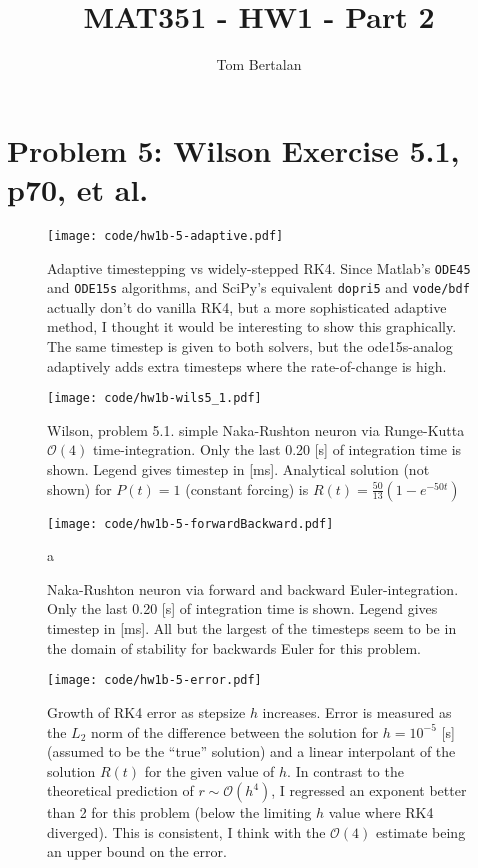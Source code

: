 \documentclass{tufte-handout}
\title{MAT351 - HW1 - Part 2}
\author{Tom Bertalan}
\begin{document}
\maketitle
\tableofcontents

\newpage
\section{Problem 5: Wilson Exercise 5.1, p70, et al.}
\begin{figure}[ht]
 \texttt{[image: code/hw1b-5-adaptive.pdf]}
 \caption{Adaptive timestepping vs widely-stepped RK4. Since Matlab's 
\texttt{ODE45} and \texttt{ODE15s} algorithms, and SciPy's equivalent
\texttt{dopri5} and \texttt{vode/bdf} actually don't do 
vanilla RK4, but a more sophisticated adaptive method, I thought it would be 
interesting to show this graphically. The same timestep is given to both 
solvers, but the ode15s-analog adaptively adds extra timesteps where the 
rate-of-change is high.\label{fig:adaptive}}
\end{figure}
\begin{figure}[ht]
 \texttt{[image: code/hw1b-wils5\_1.pdf]}
 \caption{Wilson, problem 5.1. simple Naka-Rushton neuron via Runge-Kutta 
$\mathcal O(4)$ time-integration.
Only the last 0.20 [s] of integration time is shown.
Legend gives timestep in [ms].
Analytical solution (not shown) for $P(t)=1$ (constant forcing) is $R(t) = 
\frac{50}{13}(1 - e^{-50t})$
\label{fig:wils}}
\end{figure}
\begin{figure}[ht]
 \texttt{[image: code/hw1b-5-forwardBackward.pdf]}
 \caption{Naka-Rushton neuron via forward and backward Euler-integration.
Only the last 0.20 [s] of integration time is shown.
Legend gives timestep in [ms]. All but the largest of the timesteps seem to be 
in the domain of stability for backwards Euler for this problem.
\label{fig:fb}}a
\end{figure}
\begin{figure}[ht]
 \texttt{[image: code/hw1b-5-error.pdf]}
 \caption{Growth of RK4 error as stepsize $h$ increases. Error is measured as 
the $L_2$ norm of the difference between the solution for $h=10^{-5}$ [s] 
(assumed to be the ``true'' solution) and a linear interpolant of the 
solution $R(t)$ for the given value of $h$. In contrast to the theoretical 
prediction of $r\sim\mathcal O(h^4)$, I regressed an exponent better than 2 for 
this problem (below the limiting $h$ value where RK4 diverged). This is 
consistent, I think with the $\mathcal O(4)$ estimate being an upper bound on 
the error.
\label{fig:fb}}
\end{figure}
\newpage
\end{document}
